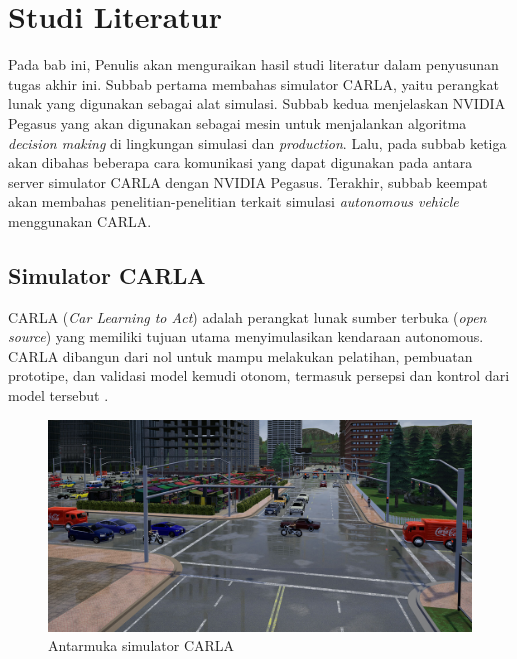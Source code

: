 \chapter{Studi Literatur}

Pada bab ini, Penulis akan menguraikan hasil studi literatur dalam penyusunan
tugas akhir ini. Subbab pertama membahas simulator CARLA, yaitu perangkat lunak
yang digunakan sebagai alat simulasi. Subbab kedua menjelaskan NVIDIA Pegasus
yang akan digunakan sebagai mesin untuk menjalankan algoritma \textit{decision
    making} di lingkungan simulasi dan \textit{production}. Lalu, pada subbab ketiga
akan dibahas beberapa cara komunikasi yang dapat digunakan pada antara server
simulator CARLA dengan NVIDIA Pegasus. Terakhir, subbab keempat akan membahas
penelitian-penelitian terkait simulasi \textit{autonomous vehicle} menggunakan
CARLA.

\section{Simulator CARLA}

CARLA (\textit{Car Learning to Act}) adalah perangkat lunak sumber terbuka
(\textit{o\-pen sour\-ce}) yang memiliki tujuan utama menyimulasikan kendaraan
autonomous. CAR\-LA dibangun dari nol untuk mampu melakukan pelatihan, pembuatan
prototipe, dan validasi model kemudi otonom, termasuk persepsi dan kontrol dari
model tersebut \parencite{dos_carla}.

\begin{center}
    \begin{figure}
        \includegraphics[width=1.0\textwidth]{resources/chapter-2/CARLA.jpg}
        \caption{Antarmuka simulator CARLA \parencite{loze_carlaDemocratizes}}
    \end{figure}
\end{center}

